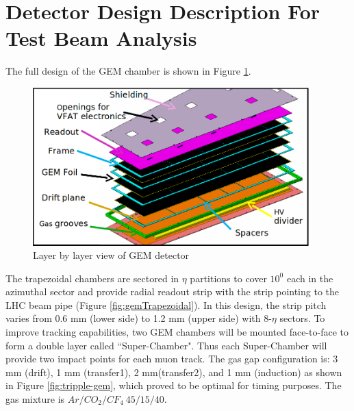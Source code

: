 \section{Detector Design Description For Test Beam Analysis}
The full design of the GEM chamber is shown in Figure \ref{fig:ge11}.
\begin{figure}[!htbp]
	\begin{center}
		\includegraphics[width=0.95\textwidth]{figures/GEM/ge11cad.png}
		\caption{Layer by layer view of GEM detector}
		\label{fig:ge11}
	\end{center}
\end{figure} 
The trapezoidal chambers are sectored in $\eta$ partitions to cover $10^0$ each in the azimuthal sector and provide radial readout strip with the strip pointing to the LHC beam pipe (Figure \ref{fig:gemTrapezoidal}). In this design, the strip pitch varies from 0.6 mm (lower side) to 1.2 mm (upper side) with 8-$\eta$ sectors. To improve tracking capabilities, two GEM chambers will be mounted face-to-face to form a double layer called ``Super-Chamber". Thus each Super-Chamber will provide two impact points for each muon track. The gas gap configuration is: 3 mm (drift), 1 mm (transfer1), 2 mm(transfer2), and 1 mm (induction) as shown in Figure \ref{fig:tripple-gem}, which proved to be optimal for timing purposes. The gas mixture is $Ar/CO_2/CF_4~45/15/40$.
